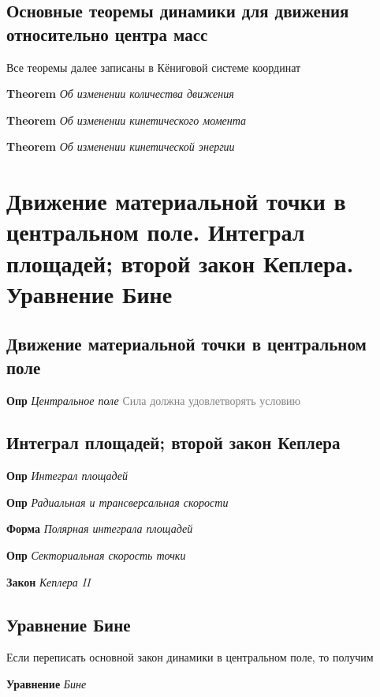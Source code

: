 \documentclass[a4paper, 14pt]{article}
\begin{document}
    \subsection{Основные теоремы динамики для движения относительно центра масс}
    
    Все теоремы далее записаны в Кёниговой системе координат
    
    \textbf{Theorem} \textit{Об изменении количества движения}
    
    \textbf{Theorem} \textit{Об изменении кинетического момента}
    
    \textbf{Theorem} \textit{Об изменении кинетической энергии}
    
    \section{Движение материальной точки в центральном поле.
    Интеграл площадей; второй закон Кеплера.
    Уравнение Бине}
    
    \subsection{Движение материальной точки в центральном поле}
    
    \textbf{Опр} \textit{Центральное поле} \textcolor{gray}{Сила должна удовлетворять условию}
    
    \subsection{Интеграл площадей; второй закон Кеплера}
    
    \textbf{Опр} \textit{Интеграл площадей}
    
    \textbf{Опр} \textit{Радиальная и трансверсальная скорости}
    
    \textbf{Форма} \textit{Полярная интеграла площадей}
    
    \textbf{Опр} \textit{Секториальная скорость точки}
    
    \textbf{Закон} \textit{Кеплера II}
    
    \subsection{Уравнение Бине}
    
    Если переписать основной закон динамики в центральном поле, то получим
    
    \textbf{Уравнение} \textit{Бине}
    
\end{document}

